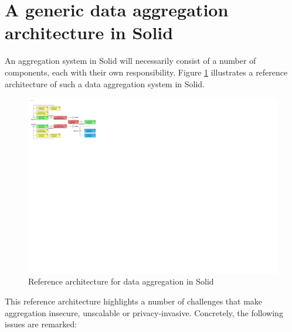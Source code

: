 \newpage

\section{A generic data aggregation architecture in Solid}
\label{sec:generic-agg-arch}
An aggregation system in Solid will necessarily consist of a number of components, each with their own responsibility. Figure \ref{fig:reference-architecture} illustrates a reference architecture of such a data aggregation system in Solid. 

\begin{figure}[h]
    \centering
    \includegraphics[width=1.0\textwidth]{images/architecture/Reference-Architecture-Aggregator.pdf}
    \caption{Reference architecture for data aggregation in Solid}
    \label{fig:reference-architecture}
\end{figure}

\noindent This reference architecture highlights a number of challenges that make aggregation insecure, unscalable or privacy-invasive. Concretely, the following issues are remarked:

